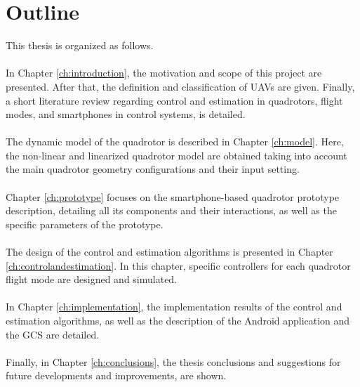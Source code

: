 \section{Outline}
This thesis is organized as follows.\\\\
In Chapter \ref{ch:introduction}, the motivation and scope of this project are presented. After that, the definition and classification of UAVs are given. Finally, a short literature review regarding control and estimation in quadrotors, flight modes, and smartphones in control systems, is detailed.
\\\\
The dynamic model of the quadrotor is described in Chapter \ref{ch:model}. Here, the non-linear and linearized quadrotor model are obtained taking into account the main quadrotor geometry configurations and their input setting. 
\\\\
Chapter \ref{ch:prototype} focuses on the smartphone-based quadrotor prototype description, detailing all its components and their interactions, as well as the specific parameters of the prototype.
\\\\
The design of the control and estimation algorithms is presented in Chapter \ref{ch:controlandestimation}. In this chapter, specific controllers for each quadrotor flight mode are designed and simulated.
\\\\
In Chapter \ref{ch:implementation}, the implementation results of the control and estimation algorithms, as well as the description of the Android application and the GCS are detailed.
\\\\
Finally, in Chapter \ref{ch:conclusions}, the thesis conclusions and suggestions for future developments and improvements, are shown.